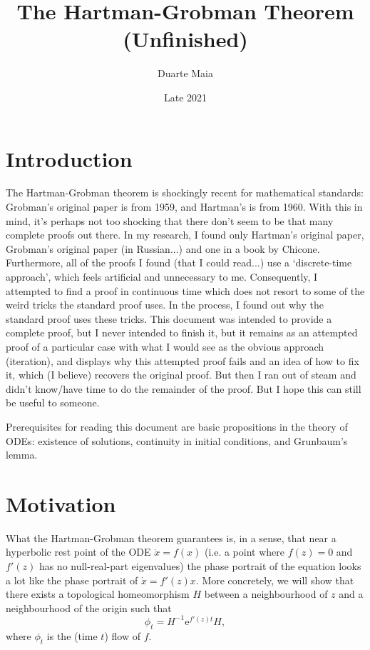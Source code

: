 \documentclass{article}
\title{The Hartman-Grobman Theorem (Unfinished)}
\author{Duarte Maia}
\date{Late 2021}
\newcommand{\e}{\mathrm{e}}
\begin{document}
\maketitle

\section{Introduction}

The Hartman-Grobman theorem is shockingly recent for mathematical standards: Grobman's original paper is from 1959, and Hartman's is from 1960. With this in mind, it's perhaps not too shocking that there don't seem to be that many complete proofs out there. In my research, I found only Hartman's original paper, Grobman's original paper (in Russian...) and one in a book by Chicone. Furthermore, all of the proofs I found (that I could read...) use a `discrete-time approach', which feels artificial and unnecessary to me. %
Consequently, I attempted to find a proof in continuous time which does not resort to some of the weird tricks the standard proof uses. In the process, I found out why the standard proof uses these tricks. This document was intended to provide a complete proof, but I never intended to finish it, but it remains as an attempted proof of a particular case with what I would see as the obvious approach (iteration), and displays why this attempted proof fails and an idea of how to fix it, which (I believe) recovers the original proof. But then I ran out of steam and didn't know/have time to do the remainder of the proof. But I hope this can still be useful to someone.

Prerequisites for reading this document are basic propositions in the theory of ODEs: existence of solutions, continuity in initial conditions, and Grunbaum's lemma.

\section{Motivation}

What the Hartman-Grobman theorem guarantees is, in a sense, that near a hyperbolic rest point of the ODE $\dot x = f(x)$ (i.e. a point where $f(z) = 0$ and $f'(z)$ has no null-real-part eigenvalues) the phase portrait of the equation looks a lot like the phase portrait of $\dot x = f'(z) x$. More concretely, we will show that there exists a topological homeomorphism $H$ between a neighbourhood of $z$ and a neighbourhood of the origin such that
\begin{equation}\label{goaleq}
\phi_t = H^{-1} \e^{f'(z) t} H,
\end{equation}
where $\phi_t$ is the (time $t$) flow of $f$.
\end{document}
